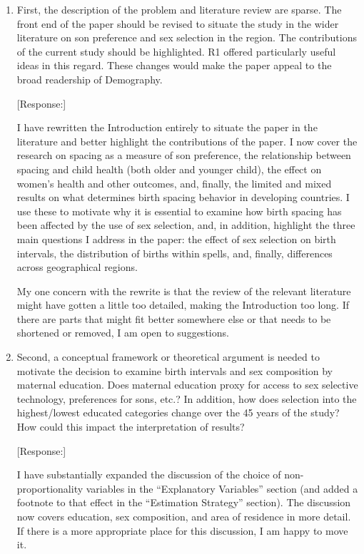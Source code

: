 \documentclass[letterpaper,12pt]{article}
\begin{document}
\begin{enumerate}

\item First, the description of the problem and literature review are sparse.
The front end of the paper should be revised to situate the study in the
wider literature on son preference and sex selection in the region. The
contributions of the current study should be highlighted. R1 offered
particularly useful ideas in this regard. These changes would make the
paper appeal to the broad readership of Demography.

[Response:]

I have rewritten the Introduction entirely to situate the paper in the literature 
and better highlight the contributions of the paper.
I now cover the research on spacing as a measure of son preference, the 
relationship between spacing and child health (both older and younger child), the 
effect on women's health and other outcomes, and, finally, the limited and mixed results
on what determines birth spacing behavior in developing countries.
I use these to motivate why it is essential to examine how birth spacing has been affected 
by the use of sex selection, and, in addition, highlight the three main questions I address 
in the paper: the effect of sex selection on birth intervals, the distribution of births 
within spells, and, finally, differences across geographical regions.

My one concern with the rewrite is that the review of the relevant literature might have 
gotten a little too detailed, making the Introduction too long. 
If there are parts that might fit better somewhere else or that needs to be shortened or
removed, I am open to suggestions.

\item Second, a conceptual framework or theoretical argument is needed to
motivate the decision to examine birth intervals and sex composition by
maternal education. Does maternal education proxy for access to sex
selective technology, preferences for sons, etc.? 
In addition, how does
selection into the highest/lowest educated categories change over the 45
years of the study? How could this impact the interpretation of results?

[Response:]

I have substantially expanded the discussion of the choice of non-proportionality 
variables in the ``Explanatory Variables'' section (and added a footnote to that effect 
in the ``Estimation Strategy'' section).
The discussion now covers education, sex composition, and area of residence in more detail.
If there is a more appropriate place for this discussion, I am happy to move it.


\end{enumerate}
\end{document}
